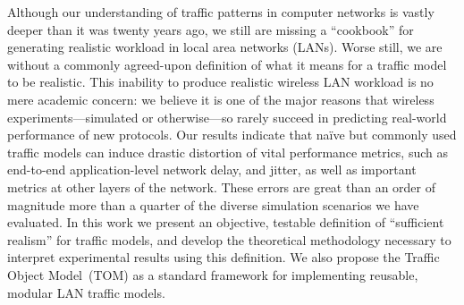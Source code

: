 Although our understanding of traffic patterns in computer networks is vastly deeper than it was twenty years ago, we still are missing a ``cookbook'' for generating realistic workload in local area networks ({\footnotesize{LAN}}s). Worse still, we are without a commonly agreed-upon definition of what it means for a traffic model to be realistic. This inability to produce realistic wireless {\footnotesize{LAN}} workload is no mere academic concern: we believe it is one of the major reasons that wireless experiments---simulated or otherwise---so rarely succeed in predicting real-world performance of new protocols. Our results indicate that na\"ive but commonly used traffic models can induce drastic distortion of vital performance metrics, such as end-to-end application-level network delay, and jitter, as well as important metrics at other layers of the network. These errors are great than an order of magnitude more than a quarter of the diverse simulation scenarios we have evaluated. In this work we present an objective, testable definition of ``sufficient realism'' for traffic models, and develop the theoretical methodology necessary to interpret experimental results using this definition. We also propose the Traffic Object Model~({\footnotesize{TOM}}) as a standard framework for implementing reusable, modular {\footnotesize{LAN}} traffic models.
%
